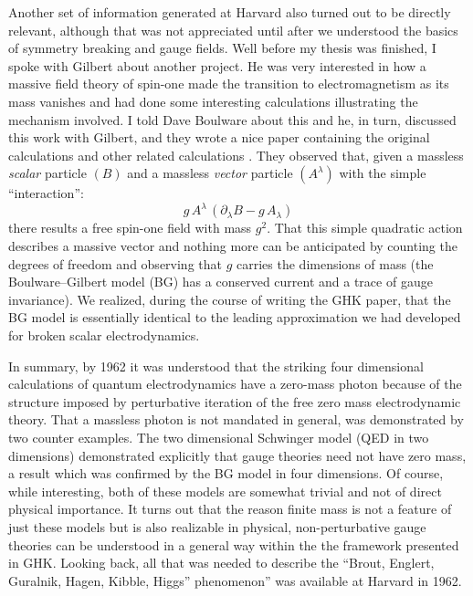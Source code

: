 \documentclass[12pt]{article}
\newcommand{\pa}{\partial}
\begin{document}
Another set of information generated at Harvard also turned out to be
directly relevant, although that was not appreciated until after we
understood the basics of symmetry breaking and gauge fields. Well
before my thesis was finished, I spoke with Gilbert about another
project. He was very interested in how a massive field theory of
spin-one made the transition to electromagnetism as its mass vanishes
and had done some interesting calculations illustrating the mechanism
involved. I told Dave Boulware about this and he, in turn, discussed
this work with Gilbert, and they wrote a nice paper containing the
original calculations and other related calculations \cite{bg;1962}.
They observed that, given a massless \emph{scalar} particle $(B)$ and
a massless \emph{vector} particle $(A^{\lambda})$ with the simple
``interaction'':
\begin{equation*} g\, A^{\lambda}\,
\left(\pa_{\lambda}B - g\,A_{\lambda}\right) \end{equation*} there
results a free spin-one field with mass {$g^2$}. That this simple
quadratic action describes a massive vector and nothing more can be
anticipated by counting the degrees of freedom and observing that $g$
carries the dimensions of mass (the Boulware--Gilbert model (BG) has
a conserved current and a trace of gauge invariance). We realized,
during the course of writing the GHK paper, that the BG model is
essentially identical to the leading approximation we had developed
for broken scalar electrodynamics.

 In summary, by 1962 it was understood that the striking four
 dimensional calculations of quantum electrodynamics have a zero-mass
 photon because of the structure imposed by perturbative iteration of
 the free zero mass electrodynamic theory. That a massless photon is
 not mandated in general, was demonstrated by two counter
 examples. The two dimensional Schwinger model \cite{sch2;1962} (QED
 in two dimensions) demonstrated explicitly that gauge theories need
 not have zero mass, a result which was confirmed by the BG model in
 four dimensions.  Of course, while interesting, both of these models
 are somewhat trivial and not of direct physical importance. It turns
 out that the reason finite mass is not a feature of just these models
 but is also realizable in physical, non-perturbative gauge theories
 can be understood in a general way within the the framework presented
 in GHK.  Looking back, all that was needed to describe the
 ``Brout, Englert, Guralnik, Hagen, Kibble, Higgs'' phenomenon'' was
 available at Harvard in 1962.
\end{document}
